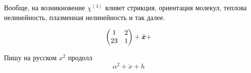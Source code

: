 Вообще, на возникновение $\chi^{(3)}$ влияет стрикция, ориентация молекул, теплова нелинейность, плазменная нелинейность и так далее. 


\begin{equation*}
    \begin{pmatrix}
        1 & 2  \\
        23 & 1  \\
    \end{pmatrix} + \bar{\mbox{\boldmath $x$}} + 
\end{equation*}

Пишу на русском $x^2$ продолл
\begin{equation*}
    \alpha^2 + \dddot{x} + h
\end{equation*}



